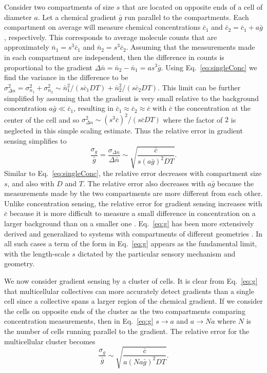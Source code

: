 \documentclass[phys,prelim]{puthesis}
\begin{document}
Consider two compartments of size $s$ that are located on opposite ends of a cell of diameter $a$. Let a chemical gradient $\bar{g}$ run parallel to the compartments. Each compartment on average will measure chemical concentrations
$\bar{c}_1$ and $\bar{c}_2=\bar{c}_1+a\bar{g}$, respectively.
This corresponds to average molecule counts that are approximately
$\bar{n}_1=s^3\bar{c}_1$ and $\bar{n}_2=s^3\bar{c}_2$.
Assuming that the measurements made in each compartment are independent, then the difference in counts is proportional to the gradient
$\Delta\bar{n} = \bar{n}_2 - \bar{n}_1 = as^3\bar{g}$.
Using Eq.\ \ref{eq:singleConc} we find the variance in the difference to be
$\sigma_{\Delta n}^2 = \sigma_{n_1}^2 + \sigma_{n_2}^2 \sim \bar{n}_1^2/(s\bar{c}_1DT) + \bar{n}_2^2/(s\bar{c}_2DT)$.
This limit can be further simplified by assuming that the gradient is very small relative to the background concentration $a\bar{g}\ll\bar{c}_1$, resulting in $\bar{c}_1\approx\bar{c}_2\approx\bar{c}$ with $\bar{c}$ the concentration at the center of the cell and so
$\sigma_{\Delta n}^2 \sim (s^3\bar{c})^2/(s\bar{c}DT)$
where the factor of $2$ is neglected in this simple scaling estimate. Thus the relative error in gradient sensing simplifies to
\begin{equation} \label{eq:g}
\frac{\sigma_g}{\bar{g}} = \frac{\sigma_{\Delta n}}{\Delta \bar{n}} \sim \sqrt{\frac{\bar{c}}{s(a\bar{g})^2DT}}.
\end{equation}
Similar to Eq.\ \ref{eq:singleConc}, the relative error decreases with compartment size $s$, and also with $D$ and $T$. The relative error also decreases with $a\bar{g}$ because the measurements made by the two compartments are more different from each other. Unlike concentration sensing, the relative error for gradient sensing increases with $\bar{c}$ because it is more difficult to measure a small difference in concentration on a larger background than on a smaller one \cite{ellison2015cell}. Eq.\ \ref{eq:g} has been more extensively derived and generalized to systems with compartments of different geometries \cite{endres2008accuracy,endres2009accuracy,hu2010physical}. In all such cases a term of the form in Eq.\ \ref{eq:g} appears as the fundamental limit, with the length-scale $s$ dictated by the particular sensory mechanism and geometry.

We now consider gradient sensing by a cluster of cells. It is clear from Eq.\ \ref{eq:g} that multicellular collectives can more accurately detect gradients than a single cell since a collective spans a larger region of the chemical gradient. If we consider the cells on opposite ends of the cluster as the two compartments comparing concentration measurements, then in Eq.\ \ref{eq:g} $s \to a$ and $a \to Na$ where $N$ is the number of cells running parallel to the gradient. The relative error for the multicellular cluster becomes \cite{mugler2015limits}
\begin{equation} \label{eq:G1}
\frac{\sigma_g}{\bar{g}} \sim \sqrt{\frac{\bar{c}}{a(Na\bar{g})^2DT}}.
\end{equation}
\end{document}
